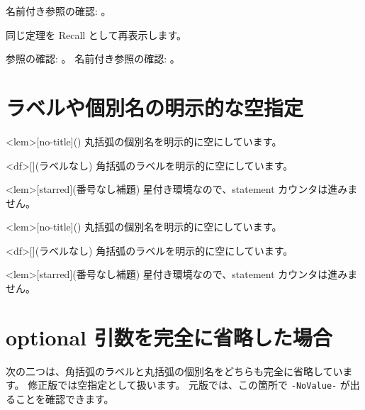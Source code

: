 \documentclass{ltjsarticle}
\begin{document}
名前付き参照の確認: 。

同じ定理を Recall として再表示します。

\begin{codeblock}
参照の確認: 。
名前付き参照の確認: 。
\end{codeblock}


\section{ラベルや個別名の明示的な空指定}

\begin{codeblock}
\begin{statementsp}<lem>[no-title]()
丸括弧の個別名を明示的に空にしています。
\end{statementsp}

\begin{statementsp}<df>[](ラベルなし)
角括弧のラベルを明示的に空にしています。
\end{statementsp}

\begin{statementsp*}<lem>[starred](番号なし補題)
星付き環境なので、statement カウンタは進みません。
\end{statementsp*}

\end{codeblock}

\begin{statementsp}<lem>[no-title]()
丸括弧の個別名を明示的に空にしています。
\end{statementsp}

\begin{statementsp}<df>[](ラベルなし)
角括弧のラベルを明示的に空にしています。
\end{statementsp}

\begin{statementsp*}<lem>[starred](番号なし補題)
星付き環境なので、statement カウンタは進みません。
\end{statementsp*}


\section{optional 引数を完全に省略した場合}

次の二つは、角括弧のラベルと丸括弧の個別名をどちらも完全に省略しています。
修正版では空指定として扱います。
元版では、この箇所で \texttt{-NoValue-} が出ることを確認できます。
\end{document}
